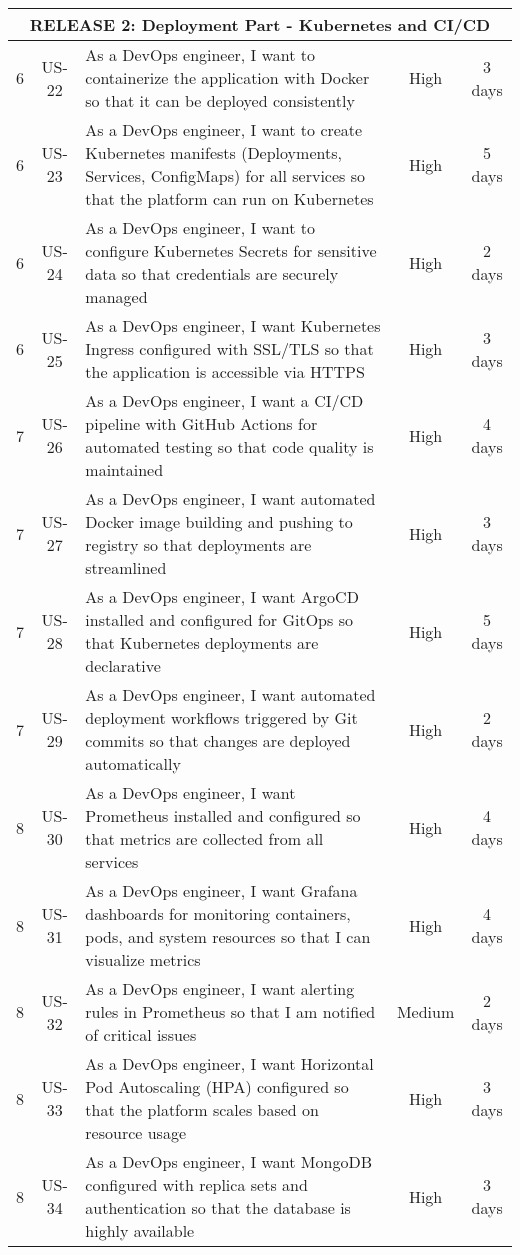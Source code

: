 \begin{longtable}{|c|c|p{7cm}|c|c|}
\multicolumn{5}{|c|}{\cellcolor{green!25}\textbf{RELEASE 2: Deployment Part - Kubernetes and CI/CD}} \\
\hline

6 & US-22 & As a DevOps engineer, I want to containerize the application with Docker so that it can be deployed consistently & High & 3 days \\ \hline
6 & US-23 & As a DevOps engineer, I want to create Kubernetes manifests (Deployments, Services, ConfigMaps) for all services so that the platform can run on Kubernetes & High & 5 days \\ \hline
6 & US-24 & As a DevOps engineer, I want to configure Kubernetes Secrets for sensitive data so that credentials are securely managed & High & 2 days \\ \hline
6 & US-25 & As a DevOps engineer, I want Kubernetes Ingress configured with SSL/TLS so that the application is accessible via HTTPS & High & 3 days \\ \hline

7 & US-26 & As a DevOps engineer, I want a CI/CD pipeline with GitHub Actions for automated testing so that code quality is maintained & High & 4 days \\ \hline
7 & US-27 & As a DevOps engineer, I want automated Docker image building and pushing to registry so that deployments are streamlined & High & 3 days \\ \hline
7 & US-28 & As a DevOps engineer, I want ArgoCD installed and configured for GitOps so that Kubernetes deployments are declarative & High & 5 days \\ \hline
7 & US-29 & As a DevOps engineer, I want automated deployment workflows triggered by Git commits so that changes are deployed automatically & High & 2 days \\ \hline

8 & US-30 & As a DevOps engineer, I want Prometheus installed and configured so that metrics are collected from all services & High & 4 days \\ \hline
8 & US-31 & As a DevOps engineer, I want Grafana dashboards for monitoring containers, pods, and system resources so that I can visualize metrics & High & 4 days \\ \hline
8 & US-32 & As a DevOps engineer, I want alerting rules in Prometheus so that I am notified of critical issues & Medium & 2 days \\ \hline
8 & US-33 & As a DevOps engineer, I want Horizontal Pod Autoscaling (HPA) configured so that the platform scales based on resource usage & High & 3 days \\ \hline
8 & US-34 & As a DevOps engineer, I want MongoDB configured with replica sets and authentication so that the database is highly available & High & 3 days \\ \hline


\end{longtable}
